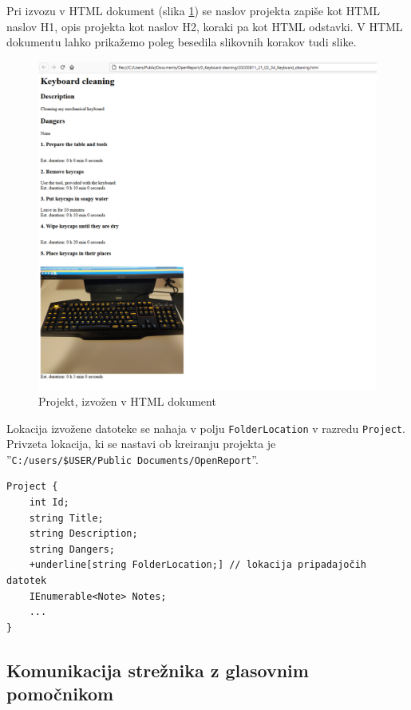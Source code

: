 \documentclass[a4paper, 12pt]{book}
\begin{document}
Pri izvozu v HTML dokument (slika \ref{export_html}) se naslov projekta zapiše kot HTML naslov H1, opis projekta kot naslov H2, koraki pa kot HTML odstavki.
V HTML dokumentu lahko prikažemo poleg besedila slikovnih korakov tudi slike.

\begin{figure}[H]
\begin{center}
\includegraphics[width=13cm]{export_html}
\end{center}
\caption{Projekt, izvožen v HTML dokument}
\label{export_html}
\end{figure}

Lokacija izvožene datoteke se nahaja v polju \texttt{FolderLocation} v razredu \texttt{Project}.
Privzeta lokacija, ki se nastavi ob kreiranju projekta je 
\\''\texttt{C:/users/\$USER/Public Documents/OpenReport}''.

\begin{Verbatim}[commandchars=+\[\]]
Project {
    int Id; 
    string Title; 
    string Description; 
    string Dangers; 
    +underline[string FolderLocation;] // lokacija pripadajočih datotek 
    IEnumerable<Note> Notes; 
    ... 
}
\end{Verbatim}

\subsection{Komunikacija strežnika z glasovnim pomočnikom}
\end{document}
